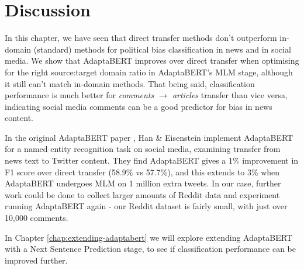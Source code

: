 \section{Discussion}

In this chapter, we have seen that direct transfer methods don't outperform in-domain (standard) methods for political bias classification in news and in social media. We show that AdaptaBERT improves over direct transfer when optimising for the right source:target domain ratio in AdaptaBERT's MLM stage, although it still can't match in-domain methods. That being said, classification performance is much better for \textit{comments $ \rightarrow $ articles} transfer than vice versa, indicating social media comments can be a good predictor for bias in news content.

In the original AdaptaBERT paper \cite{adaptabert}, Han \& Eisenstein implement AdaptaBERT for a named entity recognition task on social media, examining transfer from news text to Twitter content. They find AdaptaBERT gives a 1\% improvement in F1 score over direct transfer (58.9\% vs 57.7\%), and this extends to 3\% when AdaptaBERT undergoes MLM on 1 million extra tweets. In our case, further work could be done to collect larger amounts of Reddit data and experiment running AdaptaBERT again - our Reddit dataset is fairly small, with just over 10,000 comments.

In Chapter \ref{chap:extending-adaptabert} we will explore extending AdaptaBERT with a Next Sentence Prediction stage, to see if classification performance can be improved further.